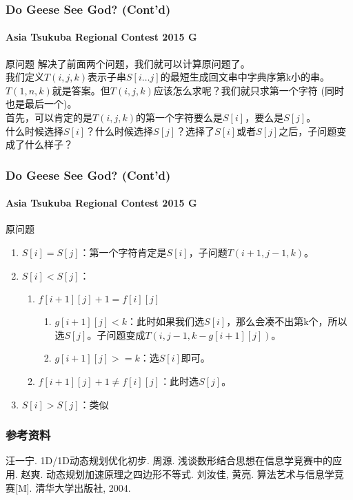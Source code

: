 \documentclass[hyperref={unicode=true}]{beamer}
\theoremstyle{definition}
\theoremstyle{proof}
\begin{document}
\begin{frame}\frametitle{Do Geese See God? (Cont'd)}
  \framesubtitle{Asia Tsukuba Regional Contest 2015 G}
  \begin{exampleblock}{原问题}
    解决了前面两个问题，我们就可以计算原问题了。\\
    我们定义$T(i,j,k)$表示子串$S[i\ldots j]$的最短生成回文串中字典序第k小的串。$T(1,n,k)$就是答案。但$T(i,j,k)$应该怎么求呢？我们就只求第一个字符 (同时也是最后一个)。\\
    \pause{}首先，可以肯定的是$T(i,j,k)$的第一个字符要么是$S[i]$，要么是$S[j]$。\\
    什么时候选择$S[i]$？什么时候选择$S[j]$？选择了$S[i]$或者$S[j]$之后，子问题变成了什么样子？
  \end{exampleblock}
\end{frame}
\begin{frame}\frametitle{Do Geese See God? (Cont'd)}
  \framesubtitle{Asia Tsukuba Regional Contest 2015 G}
  \begin{exampleblock}{原问题}
    \begin{enumerate}[<+->]
    \item $S[i]=S[j]$：第一个字符肯定是$S[i]$，子问题$T(i+1,j-1,k)$。
    \item $S[i]<S[j]$：
      \begin{enumerate}
      \item $f[i+1][j] + 1 = f[i][j]$
        \begin{enumerate}
        \item $g[i+1][j] < k$：此时如果我们选$S[i]$，那么会凑不出第k个，所以选$S[j]$。子问题变成$T(i,j-1,k-g[i+1][j])$。
        \item $g[i+1][j] >= k$：选$S[i]$即可。
        \end{enumerate}
      \item $f[i+1][j] + 1 \neq f[i][j]$：此时选$S[j]$。
      \end{enumerate}
    \item $S[i]>S[j]$：类似
    \end{enumerate}
  \end{exampleblock}
\end{frame}

\begin{frame}\frametitle{参考资料}
  \begin{thebibliography}{10}
   汪一宁. 1D/1D动态规划优化初步.
   周源. 浅谈数形结合思想在信息学竞赛中的应用.
   赵爽. 动态规划加速原理之四边形不等式.
   刘汝佳, 黄亮. 算法艺术与信息学竞赛[M]. 清华大学出版社, 2004.
  \end{thebibliography}
\end{frame}
\end{document}
